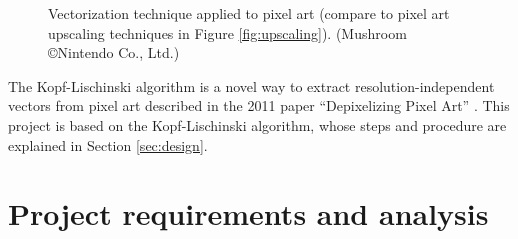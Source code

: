 \documentclass[]{usiinfbachelorproject}
\begin{document}
\begin{figure}[ht]
	\centering
	\caption{Vectorization technique applied to pixel art (compare to pixel art upscaling techniques in Figure \ref{fig:upscaling}).  (Mushroom \copyright Nintendo Co., Ltd.)}
	\label{fig:smw_mush}
\end{figure}

The Kopf-Lischinski algorithm is a novel way to extract resolution-independent vectors from pixel art described in the 2011 paper ``Depixelizing Pixel Art'' \cite{Kopf2011}. This project is based on the Kopf-Lischinski algorithm, whose steps and procedure are explained in Section \ref{sec:design}.

\section{Project requirements and analysis}
\end{document}
